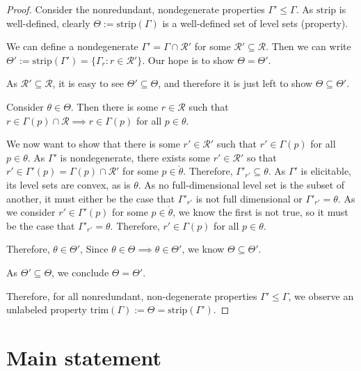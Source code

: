 \documentclass[12pt]{article}
\newcommand{\R}{\mathcal{R}}
\newcommand{\inter}[1]{\mathring{#1}}%
\newcommand{\trim}{\mathrm{trim}}
\newcommand{\strip}{\mathrm{strip}}
\begin{document}
\begin{proof}
	
	Consider the nonredundant, nondegenerate properties $\Gamma' \leq \Gamma$.
	As $\strip$ is well-defined, clearly $\Theta := \strip(\Gamma)$ is a well-defined set of level sets (property).
	
	We can define a nondegenerate $\Gamma' = \Gamma \cap \R'$ for some $\R' \subseteq \R$.
	Then we can write $\Theta' := \strip(\Gamma') = \{\Gamma_r : r \in \R' \}$.
	Our hope is to show $\Theta = \Theta'$.
	
	As $\R' \subseteq \R$, it is easy to see  $\Theta' \subseteq \Theta$, and therefore it is just left to show $\Theta \subseteq \Theta'$.
	
	Consider $\theta \in \Theta$.
	Then there is some $r \in \R$ such that $r\in\Gamma(p)\cap \R \implies r \in \Gamma(p)$ for all $p \in \theta$.
	
	We now want to show that there is some $r' \in \R'$ such that $r' \in \Gamma(p)$ for all $p \in \theta$.
	As $\Gamma'$ is nondegenerate, there exists some $r' \in \R'$ so that $r' \in \Gamma'(p) = \Gamma(p) \cap \R'$ for some $p \in \inter{\theta}$.
	Therefore, $\Gamma'_{r'} \subseteq \theta$.
	As $\Gamma'$ is elicitable, its level sets are convex, as is $\theta$.
	As no full-dimensional level set is the subset of another, it must either be the case that $\Gamma'_{r'}$ is not full dimensional or $\Gamma'_{r'} = \theta$.
	As we consider $r' \in \Gamma'(p)$ for some $p \in \inter{\theta}$, we know the first is not true, so it must be the case that $\Gamma'_{r'} = \theta$.
	Therefore, $r' \in \Gamma(p)$ for all $p \in \theta$.
	
	Therefore, $\theta \in \Theta'$,
	Since $\theta \in \Theta \implies \theta \in \Theta'$, we know $\Theta \subseteq \Theta'$.
	
	As $\Theta' \subseteq \Theta$, we conclude $\Theta = \Theta'$.
	
	Therefore, for all nonredundant, non-degenerate properties $\Gamma' \leq \Gamma$, we observe an unlabeled property $\trim(\Gamma) := \Theta = \strip(\Gamma')$.
	
\end{proof}


\section{Main statement}
\end{document}
